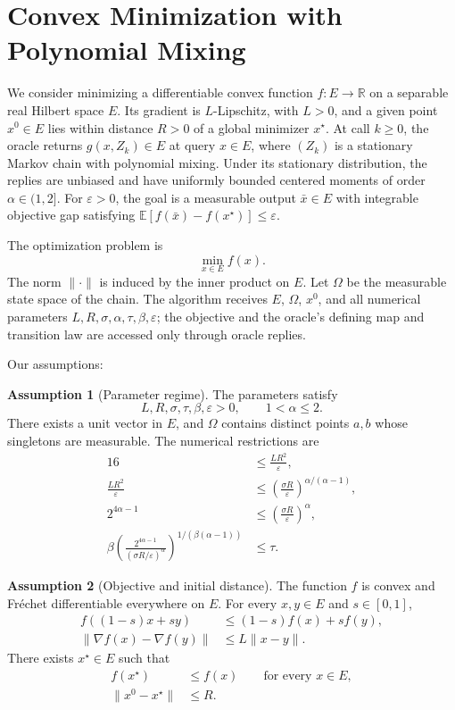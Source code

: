 \documentclass[10pt]{article}
\theoremstyle{definition}
\newtheorem{assumption}{Assumption}
\begin{document}
\section*{Convex Minimization with Polynomial Mixing}
We consider minimizing a differentiable convex function $f:E\to\mathbb{R}$ on a separable real Hilbert space $E$. Its gradient is $L$-Lipschitz, with $L>0$, and a given point $x^0\in E$ lies within distance $R>0$ of a global minimizer $x^\star$. At call $k\geq0$, the oracle returns $g(x,Z_k)\in E$ at query $x\in E$, where $(Z_k)$ is a stationary Markov chain with polynomial mixing. Under its stationary distribution, the replies are unbiased and have uniformly bounded centered moments of order $\alpha\in(1,2]$. For $\varepsilon>0$, the goal is a measurable output $\bar{x}\in E$ with integrable objective gap satisfying $\mathbb{E}[f(\bar{x})-f(x^\star)]\leq\varepsilon$.

The optimization problem is
\[
\min_{x\in E} f(x).
\]
The norm $\|\cdot\|$ is induced by the inner product on $E$. Let $\Omega$ be the measurable state space of the chain. The algorithm receives $E$, $\Omega$, $x^0$, and all numerical parameters $L,R,\sigma,\alpha,\tau,\beta,\varepsilon$; the objective and the oracle's defining map and transition law are accessed only through oracle replies.

Our assumptions:
\begin{assumption}[Parameter regime]
The parameters satisfy
\[
L,R,\sigma,\tau,\beta,\varepsilon>0,
\qquad 1<\alpha\leq2.
\]
There exists a unit vector in $E$, and $\Omega$ contains distinct points $a,b$ whose singletons are measurable. The numerical restrictions are
\[
\begin{aligned}
16&\leq\frac{LR^2}{\varepsilon},\\
\frac{LR^2}{\varepsilon}
&\leq\left(\frac{\sigma R}{\varepsilon}\right)^{\alpha/(\alpha-1)},\\
2^{4\alpha-1}
&\leq\left(\frac{\sigma R}{\varepsilon}\right)^\alpha,\\
\beta\left(
\frac{2^{4\alpha-1}}{(\sigma R/\varepsilon)^\alpha}
\right)^{1/(\beta(\alpha-1))}
&\leq\tau.
\end{aligned}
\]
\end{assumption}

\begin{assumption}[Objective and initial distance]
The function $f$ is convex and Fr\'echet differentiable everywhere on $E$. For every $x,y\in E$ and $s\in[0,1]$,
\[
\begin{aligned}
f((1-s)x+sy)&\leq(1-s)f(x)+s f(y),\\
\|\nabla f(x)-\nabla f(y)\|&\leq L\|x-y\|.
\end{aligned}
\]
There exists $x^\star\in E$ such that
\[
\begin{aligned}
f(x^\star)&\leq f(x)\qquad\text{for every }x\in E,\\
\|x^0-x^\star\|&\leq R.
\end{aligned}
\]
\end{assumption}
\end{document}
